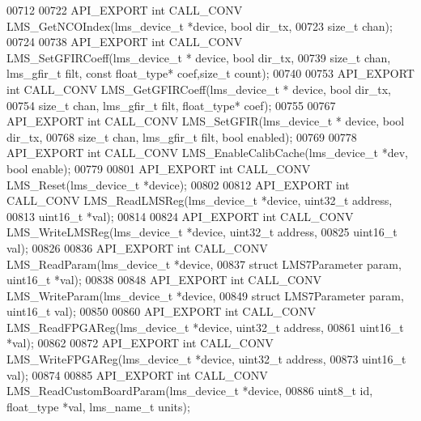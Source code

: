 \begin{DoxyCode}
00712 
00722 API_EXPORT \textcolor{keywordtype}{int} CALL_CONV LMS_GetNCOIndex(lms\_device\_t *device, \textcolor{keywordtype}{bool} dir_tx,
00723                                         \textcolor{keywordtype}{size\_t} chan);
00724 
00738 API_EXPORT \textcolor{keywordtype}{int} CALL_CONV LMS_SetGFIRCoeff(lms\_device\_t * device, \textcolor{keywordtype}{bool} dir_tx,
00739              \textcolor{keywordtype}{size\_t} chan, lms\_gfir\_t filt, \textcolor{keyword}{const} float\_type* coef,\textcolor{keywordtype}{size\_t} count);
00740 
00753 API_EXPORT \textcolor{keywordtype}{int} CALL_CONV LMS_GetGFIRCoeff(lms\_device\_t * device, \textcolor{keywordtype}{bool} dir_tx,
00754                                 \textcolor{keywordtype}{size\_t} chan, lms\_gfir\_t filt, float\_type* coef);
00755 
00767 API_EXPORT \textcolor{keywordtype}{int} CALL_CONV LMS_SetGFIR(lms\_device\_t * device, \textcolor{keywordtype}{bool} dir_tx,
00768                                     \textcolor{keywordtype}{size\_t} chan, lms\_gfir\_t filt, \textcolor{keywordtype}{bool} enabled);
00769 
00778 API_EXPORT \textcolor{keywordtype}{int} CALL_CONV LMS_EnableCalibCache(lms\_device\_t *dev, \textcolor{keywordtype}{bool} enable);
00779 
00801 API_EXPORT \textcolor{keywordtype}{int} CALL_CONV LMS_Reset(lms\_device\_t *device);
00802 
00812 API_EXPORT \textcolor{keywordtype}{int} CALL_CONV LMS_ReadLMSReg(lms\_device\_t *device, uint32\_t address,
00813                                         uint16\_t *val);
00814 
00824 API_EXPORT \textcolor{keywordtype}{int} CALL_CONV LMS_WriteLMSReg(lms\_device\_t *device, uint32\_t address,
00825                                         uint16\_t val);
00826 
00836 API_EXPORT \textcolor{keywordtype}{int} CALL_CONV LMS_ReadParam(lms\_device\_t *device,
00837                                      \textcolor{keyword}{struct} LMS7Parameter param, uint16\_t *val);
00838 
00848 API_EXPORT \textcolor{keywordtype}{int} CALL_CONV LMS_WriteParam(lms\_device\_t *device,
00849                                       \textcolor{keyword}{struct} LMS7Parameter param, uint16\_t val);
00850 
00860 API_EXPORT \textcolor{keywordtype}{int} CALL_CONV LMS_ReadFPGAReg(lms\_device\_t *device, uint32\_t address,
00861                                         uint16\_t *val);
00862 
00872 API_EXPORT \textcolor{keywordtype}{int} CALL_CONV LMS_WriteFPGAReg(lms\_device\_t *device, uint32\_t address,
00873                                         uint16\_t val);
00874 
00885 API_EXPORT \textcolor{keywordtype}{int} CALL_CONV LMS_ReadCustomBoardParam(lms\_device\_t *device,
00886                                  uint8\_t \textcolor{keywordtype}{id}, float\_type *val, lms\_name\_t units);

\end{DoxyCode}
